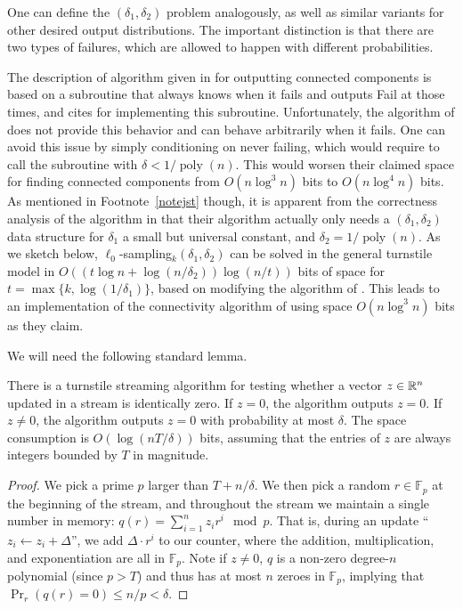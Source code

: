 One can define the $(\delta_1,\delta_2)$ problem analogously, as well as similar variants for other desired output distributions. The important distinction is that there are two types of failures, which are allowed to happen with different probabilities.

The description of algorithm given in \cite{AhnGM12a} for outputting connected components is based on a \suppfind{} subroutine that always knows when it fails and outputs \textsf{Fail} at those times, and \cite{AhnGM12a} cites \cite{JowhariST11} for implementing this subroutine. Unfortunately, the algorithm of \cite{JowhariST11} does not provide this behavior and can behave arbitrarily when it fails. One can avoid this issue by simply conditioning on never failing, which would require \cite{AhnGM12a} to call the \cite{JowhariST11} subroutine with $\delta < 1/\mathop{poly}(n)$. This would worsen their claimed space for finding connected components from $O(n\log^3 n)$ bits to $O(n\log^4 n)$ bits. As mentioned in Footnote~\ref{notejst} though, it is apparent from the correctness analysis of the algorithm in \cite{AhnGM12a} that their algorithm actually only needs a $(\delta_1,\delta_2)$ data structure for $\delta_1$ a small but universal constant, and $\delta_2 = 1/\mathop{poly}(n)$. As we sketch below, $\ell_0$-sampling$_k(\delta_1,\delta_2)$ can be solved in the general turnstile model in $O((t\log n + \log(n/\delta_2)) \log (n/t))$ bits of space for $t = \max\{k, \log(1/\delta_1)\}$, based on modifying the algorithm of \cite{JowhariST11}. This leads to an implementation of the connectivity algorithm of \cite{AhnGM12a} using space $O(n\log^3 n)$ bits as they claim.

We will need the following standard lemma.

\begin{lemma}\label{lem:zero-test}
There is a turnstile streaming algorithm for testing whether a vector $z\in\mathbb{R}^n$ updated in a stream is identically zero. If $z=0$, the algorithm outputs $z=0$. If $z\neq 0$, the algorithm outputs $z=0$ with probability at most $\delta$. The space consumption is $O(\log(nT/\delta))$ bits, assuming that the entries of $z$ are always integers bounded by $T$ in magnitude.
\end{lemma}
\begin{proof}
We pick a prime $p$ larger than $T + n/\delta$. We then pick a random $r\in\mathbb{F}_p$ at the beginning of the stream, and throughout the stream we maintain a single number in memory: $q(r) = \sum_{i=1}^n z_i r^i\mod p$. That is, during an update ``$z_i\leftarrow z_i + \Delta$'', we add $\Delta \cdot r^i$ to our counter, where the addition, multiplication, and exponentiation are all in $\mathbb{F}_p$. Note if $z\neq 0$, $q$ is a non-zero degree-$n$ polynomial (since $p > T$) and thus has at most $n$ zeroes in $\mathbb{F}_p$, implying that $\Pr_r(q(r) = 0) \le n/p < \delta$.
\end{proof}

